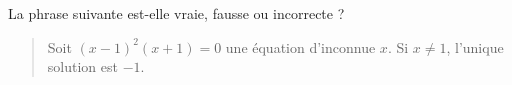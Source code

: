 La phrase suivante est-elle vraie, fausse ou incorrecte ?
\begin{quote}
 Soit $(x-1)^2(x+1)=0$ une \'equation d'inconnue $x$. Si $x\neq1$, l'unique solution est $-1$.
\end{quote}
